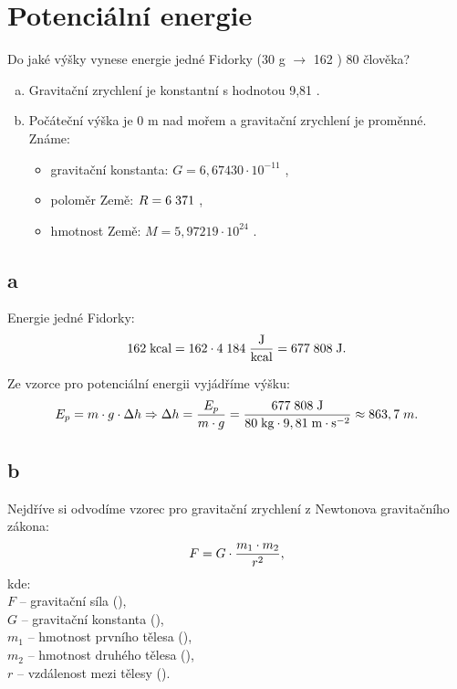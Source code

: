 \documentclass{article}
\begin{document}
\maketitle
\tableofcontents
\newpage



\section{ Potenciální energie \spicy}
Do jaké výšky vynese energie jedné Fidorky (30 g $\rightarrow$ 162 \ueqKCAL) 80 \ueqKG \fs člověka?

\begin{enumerate}[a)]
    \item Gravitační zrychlení je konstantní s hodnotou 9,81 \ueqMandSinvsq.
    \item Počáteční výška je 0 m nad mořem a gravitační zrychlení je proměnné. Známe:
          \begin{itemize}
              \item gravitační konstanta: $G = 6,67430 \cdot 10^{-11}$ \ueqNandMsqKGinvsq,
              \item poloměr Země: $R = 6 \; 371$ \ueqKM,
              \item hmotnost Země: $M = 5,97219 \cdot 10^{24}$ \ueqKG.
          \end{itemize}
\end{enumerate}


\subsection{a}
Energie jedné Fidorky:
$$
    162 \; \textrm{kcal} = 162 \cdot 4 \; 184 \; \frac{\textrm{J}}{\textrm{kcal}} = 677 \; 808 \; \textrm{J}.
$$

Ze vzorce pro potenciální energii vyjádříme výšku:
$$
    E_p = m \cdot g \cdot \Delta h \Rightarrow \Delta h = \frac{E_p}{m \cdot g} = \frac{677 \; 808 \; \textrm{J}}{80 \; \textrm{kg} \cdot 9,81 \; \textrm{m} \cdot \textrm{s}^{-2}} \approx 863,7 \; m.
$$


\subsection{b \spicy \spicy \spicy}
Nejdříve si odvodíme vzorec pro gravitační zrychlení z Newtonova gravitačního zákona:
\begin{equation}
    F = G \cdot \frac{m_1 \cdot m_2}{r^2},
    \unit{(\ueqN)}
\end{equation}
kde:\\
$F$ -- gravitační síla (\ueqN),\\
$G$ -- gravitační konstanta (\ueqNandMsqKGinvsq),\\
$m_1$ -- hmotnost prvního tělesa (\ueqKG),\\
$m_2$ -- hmotnost druhého tělesa (\ueqKG),\\
$r$ -- vzdálenost mezi tělesy (\ueqM).\\
\end{document}
